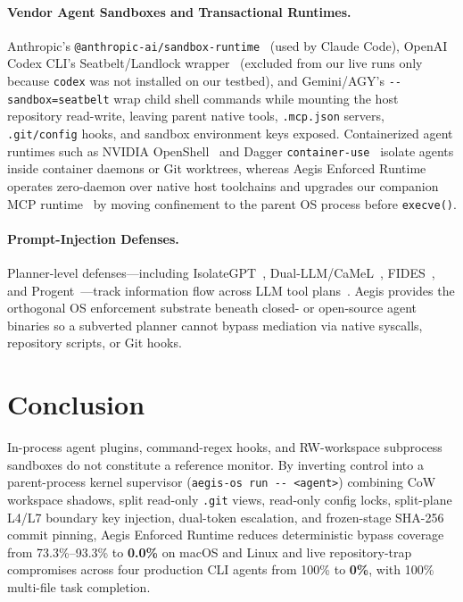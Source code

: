 \documentclass[10pt,twocolumn]{article}
\begin{document}
\paragraph{Vendor Agent Sandboxes and Transactional Runtimes.}
Anthropic's \texttt{@anthropic-ai/sandbox-runtime}~\cite{anthropic2025srt} (used by Claude Code), OpenAI Codex CLI's Seatbelt/Landlock wrapper~\cite{openai2025codex} (excluded from our live runs only because \texttt{codex} was not installed on our testbed), and Gemini/AGY's \texttt{-\/-sandbox=seatbelt} wrap child shell commands while mounting the host repository read-write, leaving parent native tools, \texttt{.mcp.json} servers, \texttt{.git/config} hooks, and sandbox environment keys exposed. Containerized agent runtimes such as NVIDIA OpenShell~\cite{nvidia2026openshell} and Dagger \texttt{container-use}~\cite{dagger2025containeruse} isolate agents inside container daemons or Git worktrees, whereas Aegis Enforced Runtime operates zero-daemon over native host toolchains and upgrades our companion MCP runtime~\cite{zhao2026aegisos} by moving confinement to the parent OS process before \texttt{execve()}.

\paragraph{Prompt-Injection Defenses.}
Planner-level defenses---including IsolateGPT~\cite{wu2024secgpt}, Dual-LLM/CaMeL~\cite{debenedetti2025camel,willison2023dualllm}, FIDES~\cite{costa2025fides}, and Progent~\cite{shi2025progent}---track information flow across LLM tool plans~\cite{debenedetti2024agentdojo,zhan2024injecagent}. Aegis provides the orthogonal OS enforcement substrate beneath closed- or open-source agent binaries so a subverted planner cannot bypass mediation via native syscalls, repository scripts, or Git hooks.

\section{Conclusion}
\label{sec:conclusion}

In-process agent plugins, command-regex hooks, and RW-workspace subprocess sandboxes do not constitute a reference monitor. By inverting control into a parent-process kernel supervisor (\texttt{aegis-os run -\/- <agent>}) combining CoW workspace shadows, split read-only \texttt{.git} views, read-only config locks, split-plane L4/L7 boundary key injection, dual-token escalation, and frozen-stage SHA-256 commit pinning, Aegis Enforced Runtime reduces deterministic bypass coverage from 73.3\%--93.3\% to \textbf{0.0\%} on macOS and Linux and live repository-trap compromises across four production CLI agents from 100\% to \textbf{0\%}, with 100\% multi-file task completion.
\end{document}

